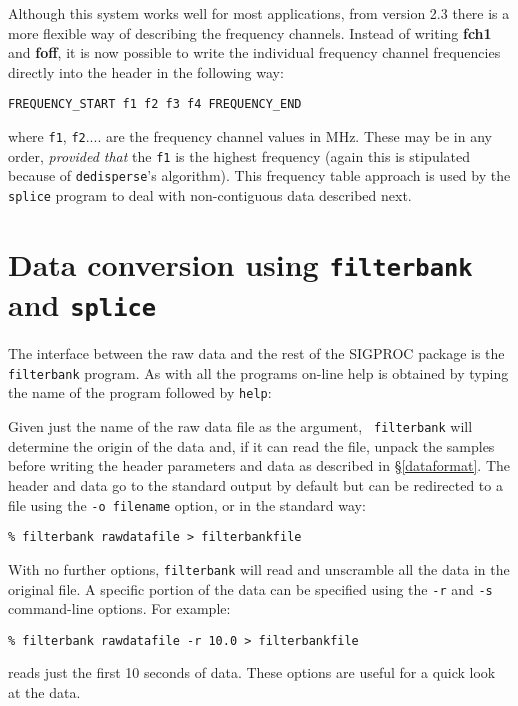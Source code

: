 \documentclass[11pt]{article}
\begin{document}
Although this system works well for most applications, from version 2.3
there is a more flexible way of describing the frequency channels.
Instead of writing {\bf fch1} and {\bf foff}, it is now possible to 
write the individual frequency channel frequencies directly into the header
in the following way:
\begin{verbatim}
FREQUENCY_START f1 f2 f3 f4 FREQUENCY_END
\end{verbatim}
where \verb+f1+, \verb+f2+.... are the frequency channel
values in MHz. These may be in any order, {\em provided that}
the \verb+f1+ is the highest frequency (again this is 
stipulated because of {\tt dedisperse}'s algorithm).
This frequency table approach is used by the {\tt splice} program
to deal with non-contiguous data described next.

\clearpage
\section{Data conversion using {\tt filterbank} and {\tt splice}}
\label{filterbank}

The interface between the raw data and the rest of the SIGPROC package
is the {\tt filterbank} program. As with all the programs on-line help
is obtained by typing the name of the program followed by {\tt help}:

Given just the name of the raw data file as the argument, {\tt
filterbank} will determine the origin of the data and, if it can read
the file, unpack the samples before writing the header parameters
and data as described in \S \ref{dataformat}. The header and data go
to the standard output by default but can be redirected to a file
using the {\tt -o filename} option, or in the standard way:
\begin{verbatim}
% filterbank rawdatafile > filterbankfile
\end{verbatim}
With no further options, {\tt filterbank} will read and unscramble all
the data in the original file. A specific portion of the data can be
specified using the {\tt -r} and {\tt -s} command-line options. For example:
\begin{verbatim}
% filterbank rawdatafile -r 10.0 > filterbankfile
\end{verbatim}
reads just the first 10 seconds of data. These options are useful for
a quick look at the data.
\end{document}
